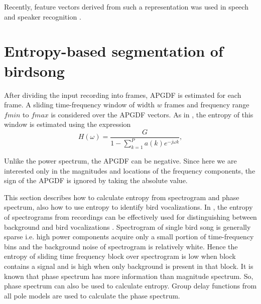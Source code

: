 \documentclass[a4paper]{article}
\begin{document}
Recently, feature vectors
derived from such a representation was used in speech \cite{drugman} and speaker
recognition \cite{padman}. 









\section{Entropy-based segmentation of birdsong}

After dividing the input recording into frames, APGDF is estimated for each
frame. A sliding time-frequency window of width $w$ frames and frequency range
$fmin$ to $fmax$ is considered over the APGDF vectors. As in \cite{wang2013},
the entropy of this window is estimated using the expression
\begin{equation}
H(\omega) = \frac{G}{1-\sum_{k=1}^{P} a(k) e^{-j \omega k}},
\end{equation}

Unlike the power spectrum, the APGDF can be negative. 
Since here we are interested only in the magnitudes and
locations of the frequency components, the sign of the APGDF is
ignored by taking the absolute value. 







This section describes how to calculate entropy from spectrogram and phase
spectrum, also how to use entropy to identify bird vocalizations. In
\cite{wang2013}, the entropy of spectrograms from recordings can be effectively used for distinguishing
between background and bird vocalizations \cite{6625329}. Spectrogram of single
bird song is generally sparse i.e. high power components acquire only a small
portion of time-frequency bins and the background noise of spectrogram is
relatively white. Hence  the entropy of sliding time frequency block over
spectrogram is low when block contains a signal and is high when only background
is present in that block. It is known that phase spectrum has more information
than magnitude spectrum. So, phase spectrum can also be used to calculate
entropy. Group delay functions from all pole models are used to calculate the
phase spectrum. 
\end{document}
